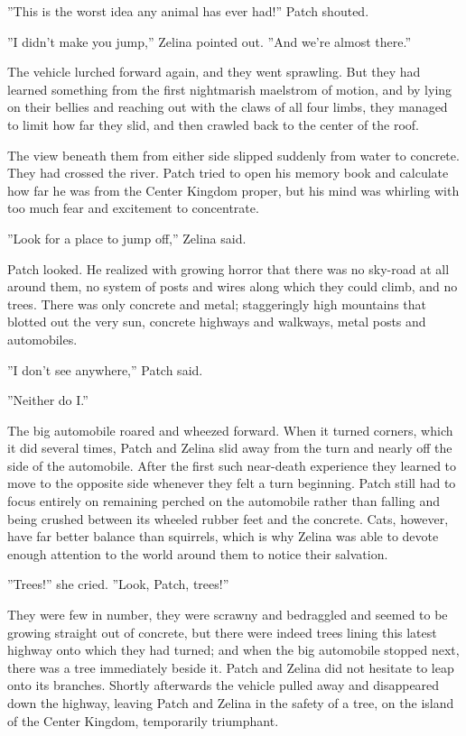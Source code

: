 \documentclass[12pt]{book}
\begin{document}
''This is the worst idea any animal has ever had!'' Patch shouted.\par
''I didn't make you jump,'' Zelina pointed out. ''And we're almost there.''\par
The vehicle lurched forward again, and they went sprawling. But they had learned something from the first nightmarish maelstrom of motion, and by lying on their bellies and reaching out with the claws of all four limbs, they managed to limit how far they slid, and then crawled back to the center of the roof.\par
The view beneath them from either side slipped suddenly from water to concrete. They had crossed the river. Patch tried to open his memory book and calculate how far he was from the Center Kingdom proper, but his mind was whirling with too much fear and excitement to concentrate.\par
 ''Look for a place to jump off,'' Zelina said.\par
 Patch looked. He realized with growing horror that there was no sky-road at all around them, no system of posts and wires along which they could climb, and no trees. There was only concrete and metal; staggeringly high mountains that blotted out the very sun, concrete highways and walkways, metal posts and automobiles.\par
 ''I don't see anywhere,'' Patch said.\par
 ''Neither do I.''\par
 The big automobile roared and wheezed forward. When it turned corners, which it did several times, Patch and Zelina slid away from the turn and nearly off the side of the automobile. After the first such near-death experience they learned to move to the opposite side whenever they felt a turn beginning. Patch still had to focus entirely on remaining perched on the automobile rather than falling and being crushed between its wheeled rubber feet and the concrete. Cats, however, have far better balance than squirrels, which is why Zelina was able to devote enough attention to the world around them to notice their salvation.\par
 ''Trees!'' she cried. ''Look, Patch, trees!''\par
 They were few in number, they were scrawny and bedraggled and seemed to be growing straight out of concrete, but there were indeed trees lining this latest highway onto which they had turned; and when the big automobile stopped next, there was a tree immediately beside it. Patch and Zelina did not hesitate to leap onto its branches. Shortly afterwards the vehicle pulled away and disappeared down the highway, leaving Patch and Zelina in the safety of a tree, on the island of the Center Kingdom, temporarily triumphant.\par
\end{document}
